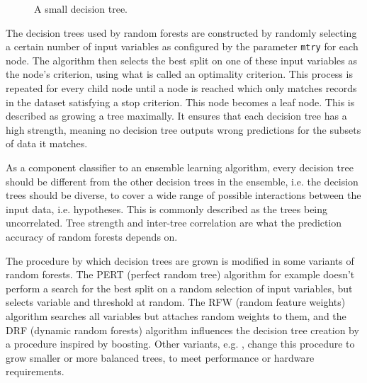 \documentclass[a4paper,man,12pt,apacite,floatsintext,draftfirst]{apa6} %
\begin{document}
\begin{figure}
\caption{A small decision tree.}
\begin{center}
\end{center}
\end{figure}

The decision trees used by random forests are constructed by randomly
selecting a certain number of input variables as configured by the parameter
\texttt{mtry} for each node.
The algorithm then selects the best split on one of these input
variables as the node's criterion, using what is called an optimality criterion.
This process is repeated for every child node until a node is reached
which only matches records in the dataset satisfying a stop criterion.
This node becomes a leaf node.
This is described as growing a tree maximally.
It ensures that each decision tree has a high strength,
meaning no decision tree outputs wrong predictions for the subsets of data
it matches. \cite{breiman2001random}

As a component classifier to an ensemble learning algorithm,
every decision tree should be different from the other decision trees in
the ensemble, i.e. the decision trees should be diverse,
to cover a wide range of possible interactions between the input data,
i.e. hypotheses.
This is commonly described as the trees being uncorrelated.
Tree strength and inter-tree correlation are what the prediction accuracy
of random forests depends on. \cite{breiman2001random}

The procedure by which decision trees are grown is modified in some
variants of random forests.
The PERT (perfect random tree) algorithm \cite{cutler2001pert} for example doesn't perform a
search for the best split on a random selection of input variables,
but selects variable and threshold at random.
The RFW (random feature weights) algorithm \cite{maudes2012random} searches all variables but attaches random
weights to them, and the DRF (dynamic random forests) algorithm \cite{bernard2012dynamic} influences the
decision tree creation by a procedure inspired by boosting.
Other variants, e.g. , change this procedure to
grow smaller or more balanced trees, to meet performance or
hardware requirements.
\end{document}
